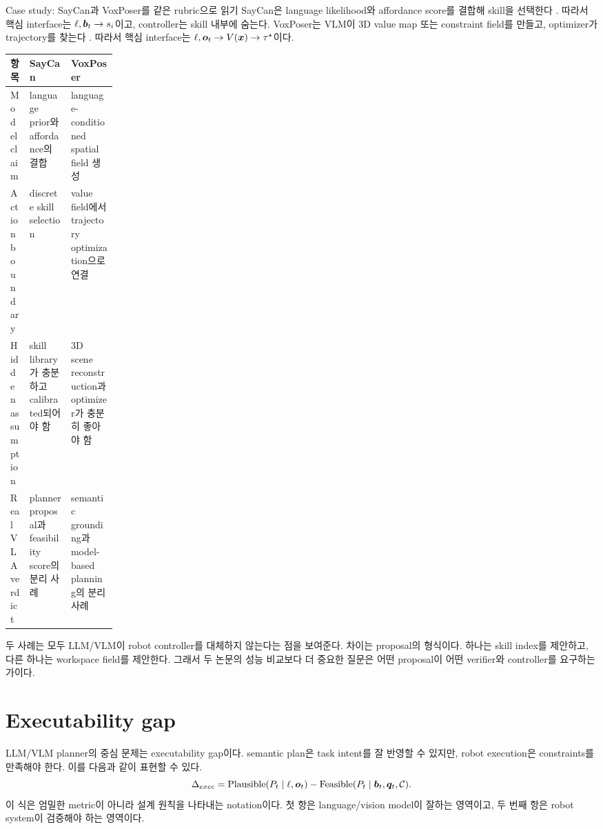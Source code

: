 \begin{casebox}{Case study: SayCan과 VoxPoser를 같은 rubric으로 읽기}
SayCan은 language likelihood와 affordance score를 결합해 skill을 선택한다 \cite{saycan2022}. 따라서 핵심 interface는 $\ell,\bm{b}_t \rightarrow s_i$이고, controller는 skill 내부에 숨는다. VoxPoser는 VLM이 3D value map 또는 constraint field를 만들고, optimizer가 trajectory를 찾는다 \cite{voxposer2023}. 따라서 핵심 interface는 $\ell,\bm{o}_t \rightarrow V(\bm{x}) \rightarrow \tau^\star$이다.

\begin{center}
\small
\begin{tabularx}{\linewidth}{@{}p{0.18\linewidth}X X@{}}
\toprule
항목 & SayCan & VoxPoser \\
\midrule
Model claim & language prior와 affordance의 결합 & language-conditioned spatial field 생성 \\
Action boundary & discrete skill selection & value field에서 trajectory optimization으로 연결 \\
Hidden assumption & skill library가 충분하고 calibrated되어야 함 & 3D scene reconstruction과 optimizer가 충분히 좋아야 함 \\
Real VLA verdict & planner proposal과 feasibility score의 분리 사례 & semantic grounding과 model-based planning의 분리 사례 \\
\bottomrule
\end{tabularx}
\end{center}

두 사례는 모두 LLM/VLM이 robot controller를 대체하지 않는다는 점을 보여준다. 차이는 proposal의 형식이다. 하나는 skill index를 제안하고, 다른 하나는 workspace field를 제안한다. 그래서 두 논문의 성능 비교보다 더 중요한 질문은 어떤 proposal이 어떤 verifier와 controller를 요구하는가이다.
\end{casebox}

\section{Executability gap}

LLM/VLM planner의 중심 문제는 executability gap이다. semantic plan은 task intent를 잘 반영할 수 있지만, robot execution은 constraints를 만족해야 한다. 이를 다음과 같이 표현할 수 있다.
\begin{equation}
  \Delta_{exec}
  =
  \mathrm{Plausible}(P_t \mid \ell,\bm{o}_t)
  -
  \mathrm{Feasible}(P_t \mid \bm{b}_t,\bm{q}_t,\mathcal{C}).
  \label{eq:executability-gap}
\end{equation}
이 식은 엄밀한 metric이 아니라 설계 원칙을 나타내는 notation이다. 첫 항은 language/vision model이 잘하는 영역이고, 두 번째 항은 robot system이 검증해야 하는 영역이다.

